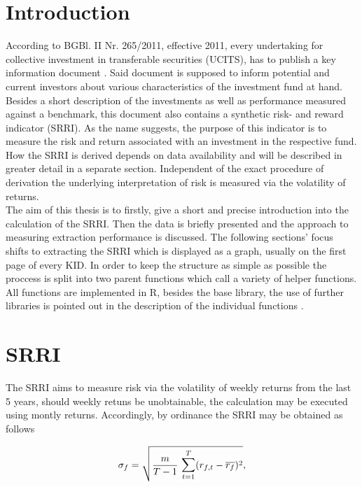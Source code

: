 \documentclass[aodsor,preprint]{imsart}
\numberwithin{equation}{section}
\theoremstyle{plain}
\begin{document}
\section{Introduction}
According to BGBl. II Nr. 265/2011, effective 2011, every undertaking for collective investment in transferable securities (UCITS), has to publish a key information document \citep{BGB1}. Said document is supposed to inform potential and current investors about various characteristics of the investment fund at hand. Besides a short description of the investments as well as performance measured against a benchmark, this document also contains a synthetic risk- and reward indicator (SRRI). As the name suggests, the purpose of this indicator is to measure the risk and return associated with an investment in the respective fund. How the SRRI is derived depends on data availability and will be described in greater detail in a separate section. Independent of the exact procedure of derivation the underlying interpretation of risk is measured via the volatility of returns.\\
The aim of this thesis is to firstly, give a short and precise introduction into the calculation of the SRRI. Then the data is briefly presented and the approach to measuring extraction performance is discussed. The following sections' focus shifts to extracting the SRRI which is displayed as a graph, usually on the first page of every KID. In order to keep the structure as simple as possible the proccess is split into two parent functions which call a variety of helper functions. All functions are implemented in R, besides the base library, the use of further libraries is pointed out in the description of the individual functions \citep{base}.

\newpage

\section{SRRI}

The SRRI aims to measure risk via the volatility of weekly returns from the last 5 years, should weekly retuns be unobtainable, the calculation may be executed using montly returns. Accordingly, by ordinance the SRRI may be obtained as follows

\[
\sigma_f = \sqrt{\frac{m}{T - 1}\text{ }\mathlarger{\sum}_{t = 1}^{T} (r_{f, t} - \overline{r_f})^2},
\]
\end{document}
